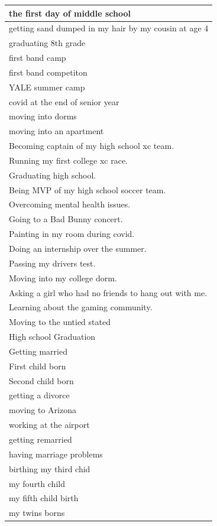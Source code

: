 \documentclass[
  .7em,
  letterpaper,
  DIV=11,
  numbers=noendperiod]{scrartcl}
\begin{document}
\begin{table}
\begin{tabular}{l}
\hline
the first day of middle school\\
\hline
getting sand dumped in my hair by my cousin at age 4\\
\hline
graduating 8th grade\\
\hline
first band camp\\
\hline
first band competiton\\
\hline
YALE summer camp\\
\hline
covid at the end of senior year\\
\hline
moving into dorms\\
\hline
moving into an apartment\\
\hline
Becoming captain of my high school xc team.\\
\hline
Running my first college xc race.\\
\hline
Graduating high school.\\
\hline
Being MVP of my high school soccer team.\\
\hline
Overcoming mental health issues.\\
\hline
Going to a Bad Bunny concert.\\
\hline
Painting in my room during covid.\\
\hline
Doing an internship over the summer.\\
\hline
Passing my drivers test.\\
\hline
Moving into my college dorm.\\
\hline
Asking a girl who had no friends to hang out with me.\\
\hline
Learning about the gaming community.\\
\hline
Moving to the untied stated\\
\hline
High school Graduation\\
\hline
Getting married\\
\hline
First child born\\
\hline
Second child born\\
\hline
getting a divorce\\
\hline
moving to Arizona\\
\hline
working at the airport\\
\hline
getting remarried\\
\hline
having marriage problems\\
\hline
birthing my third chid\\
\hline
my fourth child\\
\hline
my fifth child birth\\
\hline
my twins borns\\

\end{tabular}
\end{table}
\end{document}
